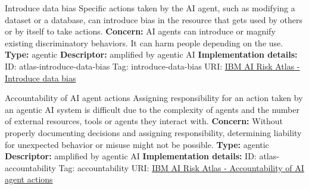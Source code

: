 \documentclass[a4paper,12pt]{article}
\begin{document}
\begin{definitionbox}{Introduce data bias}
Specific actions taken by the AI agent, such as modifying a dataset or a database, can introduce bias in the resource that gets used by others or by itself to take actions.\newline\newline
\textbf{Concern: }AI agents can introduce or magnify existing discriminatory behaviors. It can harm people depending on the use.\newline\newline
\textbf{Type: }agentic\newline
\textbf{Descriptor: }amplified by agentic AI \newline\newline
\textbf{Implementation details: } \newline
ID: atlas-introduce-data-bias \newline
Tag: introduce-data-bias \newline
URI:  \href{https://www.ibm.com/docs/en/watsonx/saas?topic=SSYOK8/wsj/ai-risk-atlas/introduce-data-bias.html}{IBM AI Risk Atlas - Introduce data bias}\newline
\end{definitionbox}
\begin{definitionbox}{Accountability of AI agent actions}
Assigning responsibility for an action taken by an agentic AI system is difficult due to the complexity of agents and the number of external resources, tools or agents they interact with.\newline\newline
\textbf{Concern: }Without properly documenting decisions and assigning responsibility, determining liability for unexpected behavior or misuse might not be possible.\newline\newline
\textbf{Type: }agentic\newline
\textbf{Descriptor: }amplified by agentic AI \newline\newline
\textbf{Implementation details: } \newline
ID: atlas-accountability \newline
Tag: accountability \newline
URI:  \href{https://www.ibm.com/docs/en/watsonx/saas?topic=SSYOK8/wsj/ai-risk-atlas/accountability.html}{IBM AI Risk Atlas - Accountability of AI agent actions}\newline
\end{definitionbox}
\end{document}
